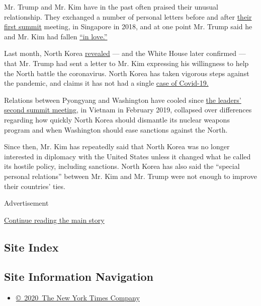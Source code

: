 Mr. Trump and Mr. Kim have in the past often praised their unusual
relationship. They exchanged a number of personal letters before and
after
\href{https://www.nytimes.com/2018/06/12/world/asia/north-korea-summit.html}{their
first summit} meeting, in Singapore in 2018, and at one point Mr. Trump
said he and Mr. Kim had fallen
\href{https://www.youtube.com/watch?v=LV6mVmAVQU4}{``in love.''}

Last month, North Korea
\href{https://www.nytimes.com/2020/03/21/world/asia/coronavirus-north-korea-trump-kim.html}{revealed}
--- and the White House later confirmed --- that Mr. Trump had sent a
letter to Mr. Kim expressing his willingness to help the North battle
the coronavirus. North Korea has taken vigorous steps against the
pandemic, and claims it has not had a single
\href{https://www.nytimes.com/2020/03/31/world/asia/north-korea-coronavirus.html}{case
of Covid-19.}

Relations between Pyongyang and Washington have cooled since
\href{https://www.nytimes.com/2019/02/28/world/asia/trump-kim-vietnam-summit.html}{the
leaders' second summit meeting,} in Vietnam in February 2019, collapsed
over differences regarding how quickly North Korea should dismantle its
nuclear weapons program and when Washington should ease sanctions
against the North.

Since then, Mr. Kim has repeatedly said that North Korea was no longer
interested in diplomacy with the United States unless it changed what he
called its hostile policy, including sanctions. North Korea has also
said the ``special personal relations'' between Mr. Kim and Mr. Trump
were not enough to improve their countries' ties.

Advertisement

\protect\hyperlink{after-bottom}{Continue reading the main story}

\hypertarget{site-index}{%
\subsection{Site Index}\label{site-index}}

\hypertarget{site-information-navigation}{%
\subsection{Site Information
Navigation}\label{site-information-navigation}}

\begin{itemize}
\tightlist
\item
  \href{https://help.nytimes.com/hc/en-us/articles/115014792127-Copyright-notice}{©~2020~The
  New York Times Company}
\end{itemize}


